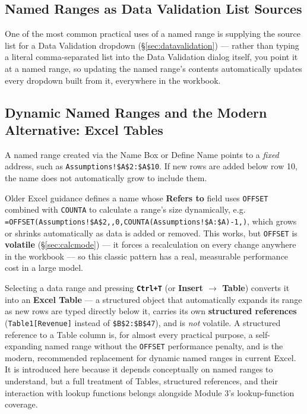 \documentclass[11pt,a4paper]{article}
\newcommand{\key}[1]{\texttt{\colorbox{black!8}{\textbf{#1}}}}
\begin{document}
\subsection{Named Ranges as Data Validation List Sources}

One of the most common practical uses of a named range is supplying the source list for a Data Validation dropdown (\S\ref{sec:datavalidation}) --- rather than typing a literal comma-separated list into the Data Validation dialog itself, you point it at a named range, so updating the named range's contents automatically updates every dropdown built from it, everywhere in the workbook.

\subsection{Dynamic Named Ranges and the Modern Alternative: Excel Tables}

A named range created via the Name Box or Define Name points to a \emph{fixed} address, such as \texttt{Assumptions!\$A\$2:\$A\$10}. If new rows are added below row 10, the name does not automatically grow to include them.

\begin{protip}
Older Excel guidance defines a name whose \textbf{Refers to} field uses \texttt{OFFSET} combined with \texttt{COUNTA} to calculate a range's size dynamically, e.g. \texttt{=OFFSET(Assumptions!\$A\$2,,0,\allowbreak COUNTA(Assumptions!\$A:\$A)-1,)}, which grows or shrinks automatically as data is added or removed. This works, but \texttt{OFFSET} is \textbf{volatile} (\S\ref{sec:calcmode}) --- it forces a recalculation on every change anywhere in the workbook --- so this classic pattern has a real, measurable performance cost in a large model.
\end{protip}

\begin{keyconcept}
Selecting a data range and pressing \key{Ctrl+T} (or \textbf{Insert $\rightarrow$ Table}) converts it into an \textbf{Excel Table} --- a structured object that automatically expands its range as new rows are typed directly below it, carries its own \textbf{structured references} (\texttt{Table1[Revenue]} instead of \texttt{\$B\$2:\$B\$47}), and is \emph{not} volatile. A structured reference to a Table column is, for almost every practical purpose, a self-expanding named range without the \texttt{OFFSET} performance penalty, and is the modern, recommended replacement for dynamic named ranges in current Excel. It is introduced here because it depends conceptually on named ranges to understand, but a full treatment of Tables, structured references, and their interaction with lookup functions belongs alongside Module 3's lookup-function coverage.
\end{keyconcept}
\end{document}
